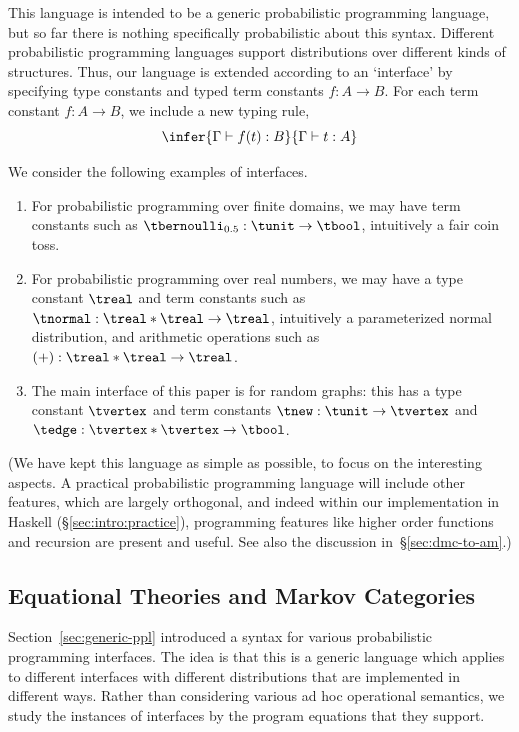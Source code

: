   This language is intended to be a generic probabilistic programming
  language, but so far there is nothing specifically probabilistic about this syntax.
  Different probabilistic programming languages support distributions
  over different kinds of structures. 
  Thus, our language is extended according to an `interface' by specifying
  type constants and typed term constants $f:A\to B$. For each term constant $f:A\to B$,
  we include a new typing rule,
 \[    \infer{\Gamma \vdash f(t) : B}
   {\Gamma \vdash t : A }\]
         \begin{example}\label{ex:interfaces}
           We consider the following examples of interfaces. 
  \begin{enumerate}
  \item For probabilistic programming over finite domains, we may have term constants such as
    $\tbernoulli_{0.5}:\tunit \to \tbool$, intuitively a fair coin toss.
  \item For probabilistic programming over real numbers, we may have a type constant $\treal$ and
    term constants such as $\tnormal:\treal\ast\treal \to\treal$,
    intuitively a parameterized normal distribution,
    and arithmetic operations such as
    $(+):\treal\ast\treal\to\treal$.
  \item The main interface of this paper is for random graphs: this
    has a type constant $\tvertex$ and term constants $
    \tnew:\tunit\to \tvertex$ and $\tedge:\tvertex\ast \tvertex \to \tbool$. 
\end{enumerate}\end{example}
 (We have kept this language as simple as possible, to focus on the interesting aspects.
 A practical probabilistic programming language will include other features, which are largely orthogonal,
 and indeed within our implementation in Haskell (\S\ref{sec:intro:practice}), programming features like higher order functions and recursion are
 present and useful. See also the discussion in~\S\ref{sec:dmc-to-am}.)

\subsection{Equational Theories and Markov Categories}
\label{sec:markov-cats}
Section~\ref{sec:generic-ppl} introduced a syntax for various probabilistic programming interfaces. 
The idea is that this is a generic language which applies to different
interfaces with different distributions that are implemented in
different ways. Rather than considering various ad hoc operational
semantics, we study the instances of interfaces by the program equations
that they support.

